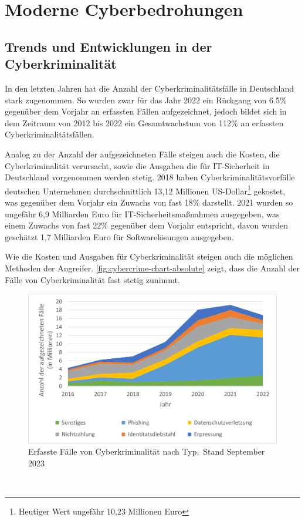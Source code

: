 \newpage


\section{Moderne Cyberbedrohungen}\label{sec:moderne-cyberbedrohungen}

\subsection{Trends und Entwicklungen in der Cyberkriminalität}\label{subsec:trends-und-entwicklungen-in-der-cyberkriminalitat}
In den letzten Jahren hat die Anzahl der Cyberkriminalitätsfälle in Deutschland stark zugenommen.
So wurden zwar für das Jahr 2022 ein Rückgang von 6.5\% gegenüber dem Vorjahr an erfassten Fällen aufgezeichnet, jedoch bildet sich in dem Zeitraum von 2012 bis 2022 ein Gesamtwachstum von 112\% an erfassten Cyberkriminalitätsfällen\autocite[\vglf][]{bka-cyberkriminalitaet}.

Analog zu der Anzahl der aufgezeichneten Fälle steigen auch die Kosten, die Cyberkriminalität verursacht, sowie die Ausgaben die für IT-Sicherheit in Deutschland vorgenommen werden stetig.
2018 haben Cyberkriminalitätsvorfälle deutschen Unternehmen durchschnittlich 13,12 Millionen US-Dollar\footnote{Heutiger Wert ungefähr 10,23 Millionen Euro} gekostet, was gegenüber dem Vorjahr ein Zuwachs von fast 18\% darstellt\autocite[\vglf][]{accenture-cyberkrime-kosten}.
2021 wurden so ungefähr 6,9 Milliarden Euro für IT-Sicherheitsmaßnahmen ausgegeben, was einem Zuwachs von fast 22\% gegenüber dem Vorjahr entspricht\autocite[\vglf][]{bitkom-itsicherheit}, davon wurden geschätzt 1,7 Milliarden Euro für Softwarelösungen ausgegeben\autocite[\vglf][]{bitkom-itsicherheit-segment}.

Wie die Kosten und Ausgaben für Cyberkriminalität steigen auch die möglichen Methoden der Angreifer.
\autoref{fig:cybercrime-chart-absolute} zeigt, dass die Anzahl der Fälle von Cyberkriminalität fast stetig zunimmt.

\begin{figure}[htpb]
    \centering
    \includegraphics[width = 0.65\linewidth]{src/abbildungen/Aufgezeichnete_Cyberkriminalitaet}
    \captionsetup{width=\linewidth, format=hang}
    \caption[Erfasste Fälle von Cyberkriminalität nach Typ]{Erfasste Fälle von Cyberkriminalität nach Typ.\footnotemark{}\ Stand September 2023}
    \label{fig:cybercrime-chart-absolute}
\end{figure}\ 

